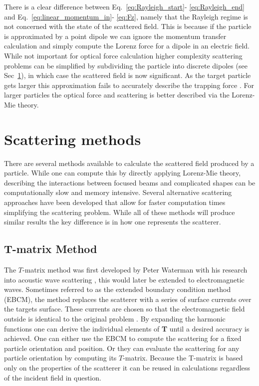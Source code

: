 There is a clear difference between Eq.~\eqref{eq:Rayleigh_start}-
\eqref{eq:Rayleigh_end} and Eq.~\eqref{eq:linear_momentum_in}- \eqref{eq:Fz}, namely that the Rayleigh regime is not concerned with 
the state of the scattered field. This is because if the particle 
is approximated by a point dipole we can ignore the momentum 
transfer calculation and simply compute the Lorenz force for a 
dipole in an electric field. While not important for optical force calculation higher complexity scattering problems can be simplified 
by subdividing the particle into discrete dipoles (see Sec~\ref{sec:scattering}), in which case the scattered field is now significant. As the target particle gets larger this approximation 
fails to accurately describe the trapping force \cite{Li2021}. For 
larger particles the optical force and scattering is better described 
via the Lorenz-Mie theory. 

\section{Scattering methods}
\label{sec:scattering}
There are several methods available to calculate the scattered 
field produced by a particle. While one can compute this by 
directly applying Lorenz-Mie theory, describing the interactions 
between focused beams and complicated shapes can be computationally 
slow and memory intensive. Several alternative scattering approaches 
have been developed that allow for faster computation times 
simplifying the scattering problem. While all of these methods will
produce similar results the key difference is in how one represents
the scatterer.
\subsection{T-matrix Method}
The $T$-matrix method was first developed by Peter Waterman with 
his research into acoustic wave scattering \cite{Waterman1969}, 
this would later be extended to electromagnetic waves. Sometimes 
referred to as the extended boundary condition method (EBCM), the 
method replaces the scatterer with a series of surface currents 
over the targets surface. These currents are chosen so that the 
electromagnetic field outside is identical to the original problem 
\cite{Wriedt1998}. By expanding the harmonic functions one can 
derive the individual elements of \textbf{T} until a desired 
accuracy is achieved. One can either use the EBCM to compute the 
scattering for a fixed particle orientation and position. Or they
can evaluate the scattering for any particle orientation by 
computing its $T$-matrix. Because the T-matrix is based only 
on the properties of the scatterer it can be reused in 
calculations regardless of the incident field in question.

